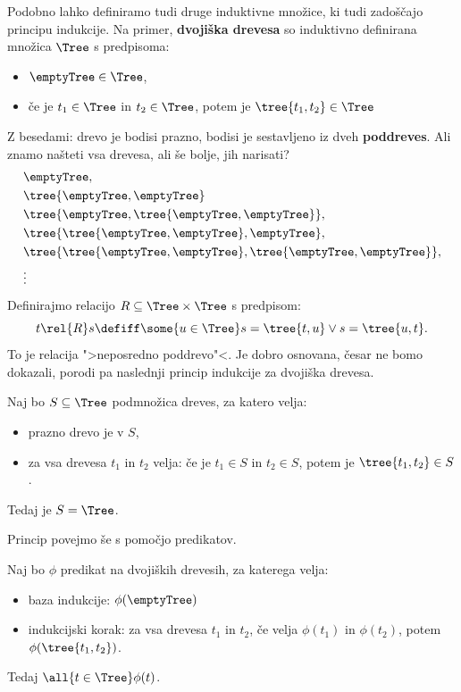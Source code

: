 Podobno lahko definiramo tudi druge induktivne množice, ki tudi zadoščajo principu indukcije.
%
Na primer, \textbf{dvojiška drevesa} so induktivno definirana množica $\Tree$ s predpisoma:
%
\begin{itemize}
\item $\emptyTree \in \Tree$,
\item če je $t_1 \in \Tree$ in $t_2 \in \Tree$, potem je $\tree{t_1, t_2} \in \Tree$
\end{itemize}
%
Z besedami: drevo je bodisi prazno, bodisi je sestavljeno iz dveh \textbf{poddreves}. Ali znamo
našteti vsa drevesa, ali še bolje, jih narisati?
%
\begin{align*}
    & \emptyTree, \\
    & \tree{\emptyTree, \emptyTree} \\
    & \tree{\emptyTree, \tree{\emptyTree, \emptyTree}}, \\
    & \tree{\tree{\emptyTree, \emptyTree}, \emptyTree}, \\
    & \tree{\tree{\emptyTree, \emptyTree}, \tree{\emptyTree, \emptyTree}}, \\
    & \vdots
\end{align*}
%
Definirajmo relacijo $R \subseteq \Tree \times \Tree$ s predpisom:
%
\begin{equation*}
  t \rel{R} s \defiff \some{u \in \Tree} s = \tree{t, u} \lor s = \tree{u, t}.
\end{equation*}
%
To je relacija ">neposredno poddrevo"<. Je dobro osnovana, česar ne bomo dokazali, porodi pa naslednji princip indukcije za dvojiška drevesa.

\begin{izjava}
  Naj bo $S \subseteq \Tree$ podmnožica dreves, za katero velja:
  \begin{itemize}
  \item prazno drevo je v $S$,
  \item za vsa drevesa $t_1$ in $t_2$ velja: če je $t_1 \in S$ in $t_2 \in S$, potem je $\tree{t_1, t_2} \in S$.
  \end{itemize}
  Tedaj je $S = \Tree$.
\end{izjava}

Princip povejmo še s pomočjo predikatov.

\begin{izjava}
  Naj bo $\phi$ predikat na dvojiških drevesih, za katerega velja:
  \begin{itemize}
  \item baza indukcije: $\phi(\emptyTree)$
  \item indukcijski korak: za vsa drevesa $t_1$ in $t_2$, če velja $\phi(t_1)$ in $\phi(t_2)$, potem
    $\phi(\tree{t_1, t_2})$.
  \end{itemize}
  Tedaj $\all{t \in \Tree} \phi(t)$.
\end{izjava}

